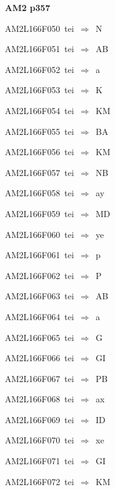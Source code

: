 \par\vfill\eject
{\bf\hfill AM2 p357\hfill\hbox{}}\par\bigskip
{\sixrm AM2L166F050\ {\sixit tei}\ }$\Rightarrow$\ N\par\smallskip
{\sixrm AM2L166F051\ {\sixit tei}\ }$\Rightarrow$\ AB\par\smallskip
{\sixrm AM2L166F052\ {\sixit tei}\ }$\Rightarrow$\ {\tenit a}\par\smallskip
{\sixrm AM2L166F053\ {\sixit tei}\ }$\Rightarrow$\ K\par\smallskip
{\sixrm AM2L166F054\ {\sixit tei}\ }$\Rightarrow$\ KM\par\smallskip
{\sixrm AM2L166F055\ {\sixit tei}\ }$\Rightarrow$\ BA\par\smallskip
{\sixrm AM2L166F056\ {\sixit tei}\ }$\Rightarrow$\ KM\par\smallskip
{\sixrm AM2L166F057\ {\sixit tei}\ }$\Rightarrow$\ NB\par\smallskip
{\sixrm AM2L166F058\ {\sixit tei}\ }$\Rightarrow$\ {\tenit ay}\par\smallskip
{\sixrm AM2L166F059\ {\sixit tei}\ }$\Rightarrow$\ MD\par\smallskip
{\sixrm AM2L166F060\ {\sixit tei}\ }$\Rightarrow$\ {\tenit ye}\par\smallskip
{\sixrm AM2L166F061\ {\sixit tei}\ }$\Rightarrow$\ {\tenit p}\par\smallskip
{\sixrm AM2L166F062\ {\sixit tei}\ }$\Rightarrow$\ P\par\smallskip
{\sixrm AM2L166F063\ {\sixit tei}\ }$\Rightarrow$\ AB\par\smallskip
{\sixrm AM2L166F064\ {\sixit tei}\ }$\Rightarrow$\ {\tenit a}\par\smallskip
{\sixrm AM2L166F065\ {\sixit tei}\ }$\Rightarrow$\ G\par\smallskip
{\sixrm AM2L166F066\ {\sixit tei}\ }$\Rightarrow$\ GI\par\smallskip
{\sixrm AM2L166F067\ {\sixit tei}\ }$\Rightarrow$\ PB\par\smallskip
{\sixrm AM2L166F068\ {\sixit tei}\ }$\Rightarrow$\ {\tenit ax}\par\smallskip
{\sixrm AM2L166F069\ {\sixit tei}\ }$\Rightarrow$\ ID\par\smallskip
{\sixrm AM2L166F070\ {\sixit tei}\ }$\Rightarrow$\ {\tenit xe}\par\smallskip
{\sixrm AM2L166F071\ {\sixit tei}\ }$\Rightarrow$\ GI\par\smallskip
{\sixrm AM2L166F072\ {\sixit tei}\ }$\Rightarrow$\ KM\par\smallskip
